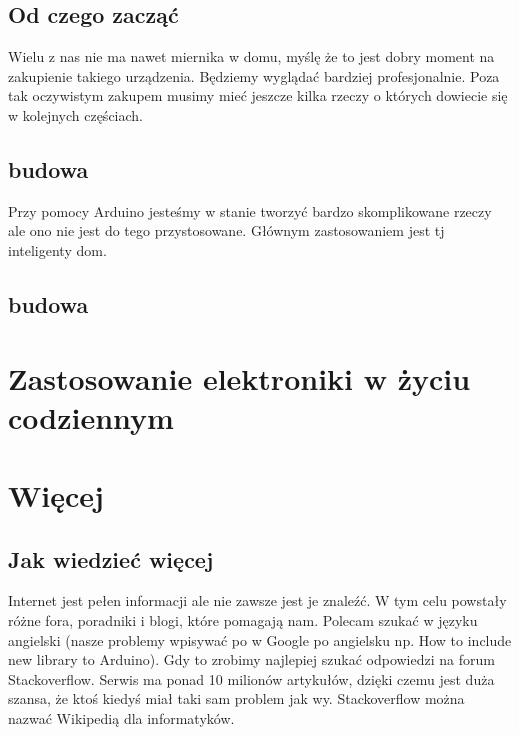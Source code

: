 \documentclass[a4paper,12pt, twoside]{article}
\let\oldsection\section		%
\renewcommand\section{\clearpage\oldsection}%
\begin{document}
		\subsection {Od czego zacząć}
			Wielu z nas nie ma nawet miernika w domu, myślę że to jest dobry moment na zakupienie takiego urządzenia. Będziemy wyglądać bardziej profesjonalnie. Poza tak oczywistym zakupem musimy mieć jeszcze kilka rzeczy o których dowiecie się w kolejnych częściach.
	\subsection{budowa}
	Przy pomocy Arduino jesteśmy w stanie tworzyć bardzo skomplikowane rzeczy ale ono nie jest do tego przystosowane. Głównym zastosowaniem jest tj inteligenty dom.
	\subsection{budowa}

\section {Zastosowanie elektroniki w życiu codziennym }

\section {Więcej}

\subsection {Jak wiedzieć więcej}
Internet jest pełen informacji ale nie zawsze jest je znaleźć. W tym celu powstały różne fora, poradniki i blogi, które pomagają nam. Polecam szukać w języku angielski (nasze problemy wpisywać po w Google po angielsku np. How to include new library to Arduino). Gdy to zrobimy najlepiej szukać odpowiedzi na forum Stackoverflow. Serwis ma ponad 10 milionów artykułów, dzięki czemu jest duża szansa, że ktoś kiedyś miał taki sam problem jak wy. Stackoverflow można nazwać Wikipedią dla informatyków. 
\end{document}

